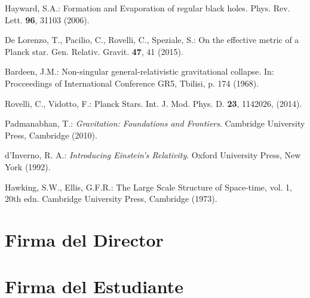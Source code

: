 \documentclass[prb,aps,preprintnumbers,amsmath,amssymb]{article}
\begin{document}
\begin{thebibliography}{10}

 Hayward, S.A.: Formation and Evaporation of regular black holes. Phys. Rev. Lett. \textbf{96}, 31103 (2006).

 De Lorenzo, T., Pacilio, C., Rovelli, C., Speziale, S.: On the effective metric of a Planck star. Gen. Relativ. Gravit. \textbf{47}, 41 (2015).

 Bardeen, J.M.: Non-singular general-relativistic gravitational collapse. In: Procceedings of International Conference GR5, Tbilisi, p. 174 (1968).

 Rovelli, C., Vidotto, F.: Planck Stars. Int. J. Mod. Phys. D. \textbf{23}, 1142026, (2014).


 Padmanabhan, T.: \textit{Gravitation: Foundations and Frontiers}. Cambridge University Press, Cambridge (2010).

 d'Inverno, R. A.: \textit{Introducing Einstein's Relativity}. Oxford University Press, New York (1992).

 Hawking, S.W., Ellis, G.F.R.: The Large Scale Structure of Space-time, vol. 1, 20th edn. Cambridge University Press, Cambridge (1973).


\end{thebibliography}

\section*{Firma del Director}
\vspace{2.5cm}

\section*{Firma del Estudiante}
\end{document}
